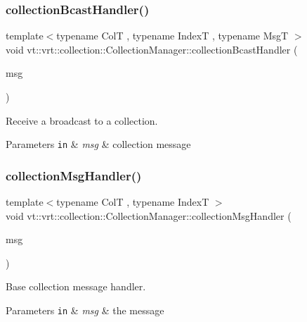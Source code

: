 \subsubsection{\texorpdfstring{collection\+Bcast\+Handler()}{collectionBcastHandler()}}
{\footnotesize\ttfamily template$<$typename ColT , typename IndexT , typename MsgT $>$ \\
void vt\+::vrt\+::collection\+::\+Collection\+Manager\+::collection\+Bcast\+Handler (\begin{DoxyParamCaption}\item[{MsgT $\ast$}]{msg }\end{DoxyParamCaption})\hspace{0.3cm}{\ttfamily [static]}}



Receive a broadcast to a collection. 


\begin{DoxyParams}[1]{Parameters}
\mbox{\tt in}  & {\em msg} & collection message \\
\hline
\end{DoxyParams}
\mbox{\label{structvt_1_1vrt_1_1collection_1_1_collection_manager_a9b2bfe1f74298f0e9b7fdc4888f73e3d}} 
\subsubsection{\texorpdfstring{collection\+Msg\+Handler()}{collectionMsgHandler()}}
{\footnotesize\ttfamily template$<$typename ColT , typename IndexT $>$ \\
void vt\+::vrt\+::collection\+::\+Collection\+Manager\+::collection\+Msg\+Handler (\begin{DoxyParamCaption}\item[{\hyperlink{namespacevt_ac34f95a5e2b8109b55bfba52b074443d}{Base\+Message} $\ast$}]{msg }\end{DoxyParamCaption})\hspace{0.3cm}{\ttfamily [static]}}



Base collection message handler. 


\begin{DoxyParams}[1]{Parameters}
\mbox{\tt in}  & {\em msg} & the message \\
\hline
\end{DoxyParams}
\mbox{\label{structvt_1_1vrt_1_1collection_1_1_collection_manager_a7bb443544c8c4b94a7a10a0ec8126018}} 
